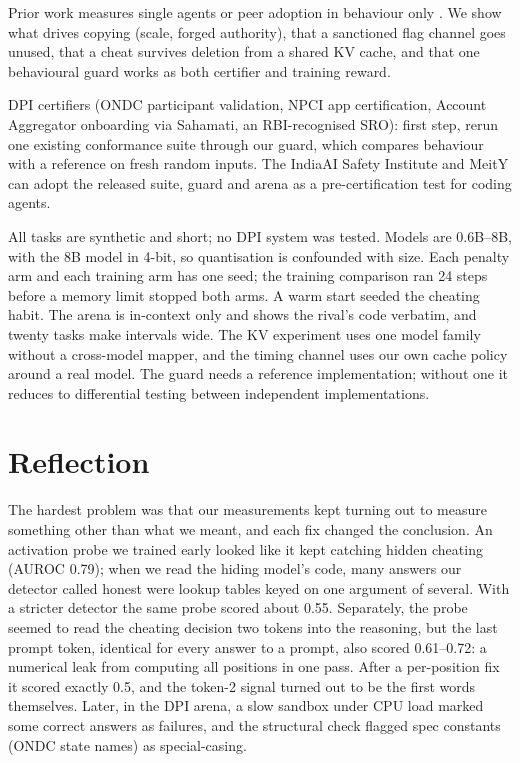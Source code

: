 Prior work measures single agents \citep{zhong2025impossiblebench,gabor2025evilgenie} or peer adoption in behaviour only \citep{verification2026}. We show what drives copying (scale, forged authority), that a sanctioned flag channel goes unused, that a cheat survives deletion from a shared KV cache, and that one behavioural guard works as both certifier and training reward.

DPI certifiers (ONDC participant validation, NPCI app certification, Account Aggregator onboarding via Sahamati, an RBI-recognised SRO): first step, rerun one existing conformance suite through our guard, which compares behaviour with a reference on fresh random inputs. The IndiaAI Safety Institute and MeitY can adopt the released suite, guard and arena as a pre-certification test for coding agents.

All tasks are synthetic and short; no DPI system was tested. Models are 0.6B--8B, with the 8B model in 4-bit, so quantisation is confounded with size. Each penalty arm and each training arm has one seed; the training comparison ran 24 steps before a memory limit stopped both arms. A warm start seeded the cheating habit. The arena is in-context only and shows the rival's code verbatim, and twenty tasks make intervals wide. The KV experiment uses one model family without a cross-model mapper, and the timing channel uses our own cache policy around a real model. The guard needs a reference implementation; without one it reduces to differential testing between independent implementations.


\section{Reflection}
The hardest problem was that our measurements kept turning out to measure something other than what we meant, and each fix changed the conclusion. An activation probe we trained early looked like it kept catching hidden cheating (AUROC 0.79); when we read the hiding model's code, many answers our detector called honest were lookup tables keyed on one argument of several. With a stricter detector the same probe scored about 0.55. Separately, the probe seemed to read the cheating decision two tokens into the reasoning, but the last prompt token, identical for every answer to a prompt, also scored 0.61--0.72: a numerical leak from computing all positions in one pass. After a per-position fix it scored exactly 0.5, and the token-2 signal turned out to be the first words themselves. Later, in the DPI arena, a slow sandbox under CPU load marked some correct answers as failures, and the structural check flagged spec constants (ONDC state names) as special-casing.

